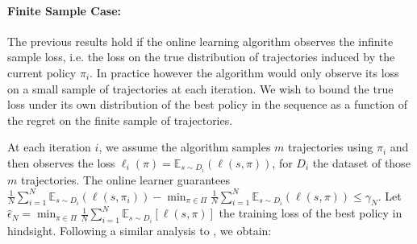 \documentclass[twoside]{article}
\begin{document}
\paragraph{Finite Sample Case:} The previous results hold if the online learning algorithm observes the infinite sample loss, i.e. the loss on the true distribution of trajectories induced by the current policy $\pi_i$. In practice however the algorithm would only observe its loss on a small sample of trajectories at each iteration. We wish to bound the true loss under its own distribution of the best policy in the sequence as a function of the regret on the finite sample of trajectories.

At each iteration $i$, we assume the algorithm samples $m$ trajectories using $\pi_i$ and then observes the loss $\ell_i(\pi) = \mathbb{E}_{s \sim D_i}(\ell(s,\pi))$, for $D_i$ the dataset of those $m$ trajectories. The online learner guarantees $\frac{1}{N}\sum_{i=1}^N \mathbb{E}_{s \sim D_i}(\ell(s,\pi_i)) - \min_{\pi \in \Pi} \frac{1}{N}\sum_{i=1}^N \mathbb{E}_{s \sim D_i}(\ell(s,\pi)) \leq \gamma_N$. Let $\hat{\epsilon}_N = \min_{\pi \in \Pi} \frac{1}{N} \sum_{i=1}^N \mathbb{E}_{s \sim D_i}[ \ell(s,\pi) ]$ the training loss of the best policy in hindsight. Following a similar analysis to \citet{CesaBianchi04}, we obtain:
%
\end{document}
